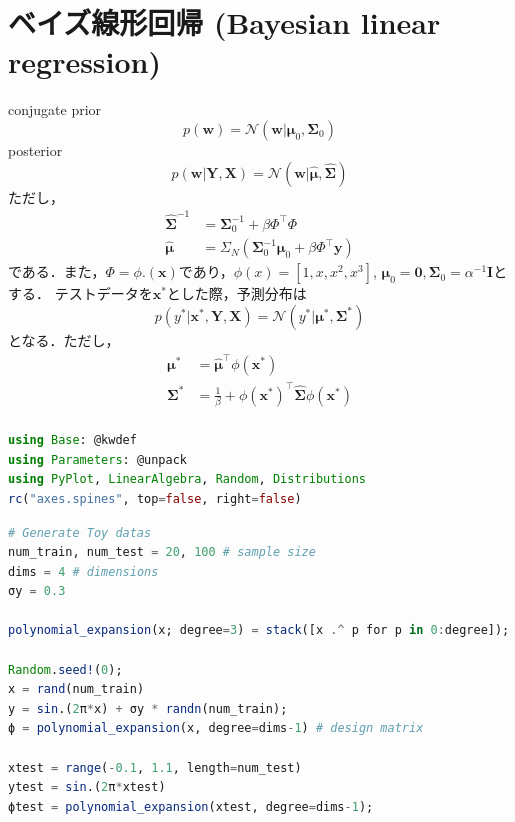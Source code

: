 \section{ベイズ線形回帰 (Bayesian linear regression)}
conjugate prior
\begin{equation}
p(\mathbf{w})=\mathcal{N}(\mathbf{w}|\boldsymbol{\mu}_0, \mathbf{\Sigma}_0)
\end{equation}
posterior
\begin{equation}
p(\mathbf{w}|\mathbf{Y}, \mathbf{X})=\mathcal{N}(\mathbf{w}|\hat{\boldsymbol{\mu}}, \hat{\mathbf{\Sigma}})
\end{equation}
ただし，
\begin{align}
\hat{\mathbf{\Sigma}}^{-1}&= \mathbf{\Sigma}_0^{-1}+ \beta \Phi^\top\Phi\\
\hat{\boldsymbol{\mu}}&=\Sigma_N (\mathbf{\Sigma}_0^{-1}\boldsymbol{\mu}_0+\beta \Phi^\top \mathbf{y})
\end{align}
である．また，$\Phi=\phi.(\mathbf{x})$であり，$\phi(x)=[1, x, x^2, x^3]$, $\boldsymbol{\mu}_0=\mathbf{0}, \mathbf{\Sigma}_0= \alpha^{-1} \mathbf{I}$とする．
テストデータを$\mathbf{x}^*$とした際，予測分布は
\begin{equation}
p(y^*|\mathbf{x}^*, \mathbf{Y}, \mathbf{X})=\mathcal{N}(y^*|\boldsymbol{\mu}^*, \mathbf{\Sigma}^*)
\end{equation}
となる．ただし，
\begin{align}
\boldsymbol{\mu}^*&=\hat{\boldsymbol{\mu}}^\top \phi(\mathbf{x}^*)\\
\mathbf{\Sigma}^* &= \frac{1}{\beta} +  \phi(\mathbf{x}^*)^\top\hat{\mathbf{\Sigma}}\phi(\mathbf{x}^*)\\
\end{align}
\begin{lstlisting}[language=julia]
using Base: @kwdef
using Parameters: @unpack
using PyPlot, LinearAlgebra, Random, Distributions
rc("axes.spines", top=false, right=false)
\end{lstlisting}
\begin{lstlisting}[language=julia]
# Generate Toy datas
num_train, num_test = 20, 100 # sample size
dims = 4 # dimensions
σy = 0.3

polynomial_expansion(x; degree=3) = stack([x .^ p for p in 0:degree]);

Random.seed!(0);
x = rand(num_train)
y = sin.(2π*x) + σy * randn(num_train);
ϕ = polynomial_expansion(x, degree=dims-1) # design matrix

xtest = range(-0.1, 1.1, length=num_test)
ytest = sin.(2π*xtest)
ϕtest = polynomial_expansion(xtest, degree=dims-1);
\end{lstlisting}

